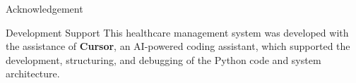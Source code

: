 \documentclass[aspectratio=169]{beamer}
\begin{document}
\begin{frame}{Acknowledgement}
\begin{block}{Development Support}
This healthcare management system was developed with the assistance of \textbf{Cursor}, an AI-powered coding assistant, which supported the development, structuring, and debugging of the Python code and system architecture.
\end{block}
\end{frame}
\end{document}
